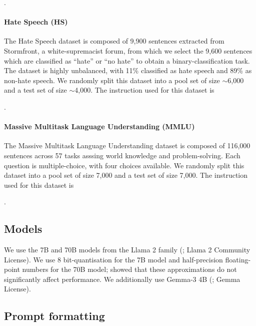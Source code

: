 .


\paragraph{Hate Speech (HS)}

The Hate Speech dataset is composed of 9,900 sentences extracted from Stormfront, a white-supremacist forum, from which we select the 9,600 sentences which are classified as ``hate'' or ``no hate'' to obtain a binary-classification task.
The dataset is highly unbalanced, with 11\% classified as hate speech and 89\% as non-hate speech.
We randomly split this dataset into a pool set of size $\sim$6,000 and a test set of size $\sim$4,000.
The instruction used for this dataset is

.


\paragraph{Massive Multitask Language Understanding (MMLU)}

The Massive Multitask Language Understanding dataset is composed of 116,000 sentences across 57 tasks asssing world knowledge and problem-solving.
Each question is multiple-choice, with four choices available.
We randomly split this dataset into a pool set of size 7,000 and a test set of size 7,000.
The instruction used for this dataset is

.


\subsection{Models}\label{models}

We use the 7B and 70B models from the Llama 2 family (\citealp{touvron2023llama};  Llama 2 Community License).
We use 8 bit-quantisation for the 7B model and half-precision floating-point numbers for the 70B model; \citet{kossen2024context} showed that these approximations do not significantly affect performance.
We additionally use Gemma-3 4B (\citealp{kamath2025gemma}; Gemma License).


\subsection{Prompt formatting}

